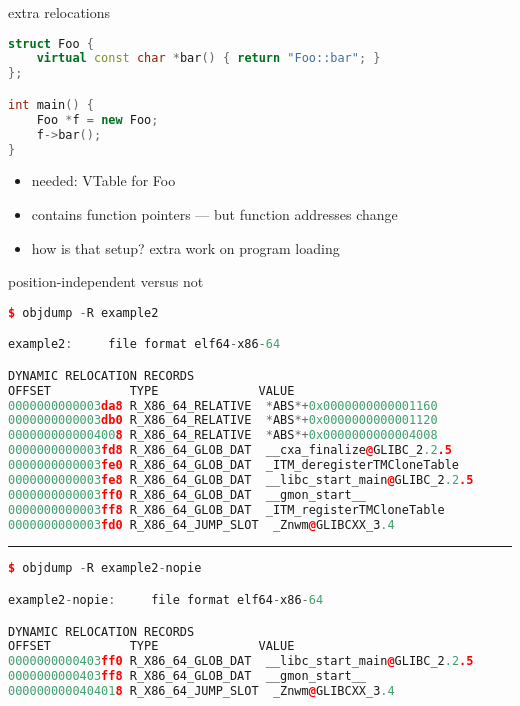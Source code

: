 \begin{frame}[fragile,label=relocVTable]{extra relocations}
\begin{lstlisting}[language=C++,style=smaller]
struct Foo {
    virtual const char *bar() { return "Foo::bar"; }
};

int main() {
    Foo *f = new Foo;
    f->bar();
}
\end{lstlisting}
\begin{itemize}
\item needed: VTable for Foo
\item contains function pointers --- but function addresses change
\item how is that setup? extra work on program loading
\end{itemize}
\end{frame}

\begin{frame}[fragile,label=relocVTable2]{position-independent versus not}
\begin{lstlisting}[language=C++,style=script]
$ objdump -R example2

example2:     file format elf64-x86-64

DYNAMIC RELOCATION RECORDS
OFFSET           TYPE              VALUE 
0000000000003da8 R_X86_64_RELATIVE  *ABS*+0x0000000000001160
0000000000003db0 R_X86_64_RELATIVE  *ABS*+0x0000000000001120
0000000000004008 R_X86_64_RELATIVE  *ABS*+0x0000000000004008
0000000000003fd8 R_X86_64_GLOB_DAT  __cxa_finalize@GLIBC_2.2.5
0000000000003fe0 R_X86_64_GLOB_DAT  _ITM_deregisterTMCloneTable
0000000000003fe8 R_X86_64_GLOB_DAT  __libc_start_main@GLIBC_2.2.5
0000000000003ff0 R_X86_64_GLOB_DAT  __gmon_start__
0000000000003ff8 R_X86_64_GLOB_DAT  _ITM_registerTMCloneTable
0000000000003fd0 R_X86_64_JUMP_SLOT  _Znwm@GLIBCXX_3.4
\end{lstlisting}
\hrule
\begin{lstlisting}[language=C++,style=script]
$ objdump -R example2-nopie

example2-nopie:     file format elf64-x86-64

DYNAMIC RELOCATION RECORDS
OFFSET           TYPE              VALUE 
0000000000403ff0 R_X86_64_GLOB_DAT  __libc_start_main@GLIBC_2.2.5
0000000000403ff8 R_X86_64_GLOB_DAT  __gmon_start__
0000000000404018 R_X86_64_JUMP_SLOT  _Znwm@GLIBCXX_3.4
\end{lstlisting}
\end{frame}

